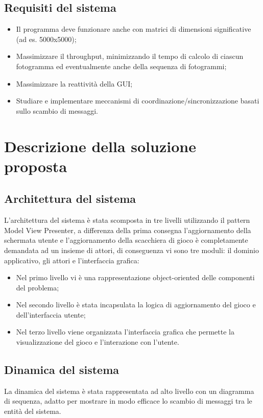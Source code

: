 \documentclass[a4paper]{report}
\begin{document}
\subsection{Requisiti del sistema}\label{requisiti-del-sistema-1}

\begin{itemize}
\item
  Il programma deve funzionare anche con matrici di dimensioni significative (ad es. 5000x5000);
\item
  Massimizzare il throughput, minimizzando il tempo di calcolo di ciascun fotogramma ed eventualmente anche della sequenza di fotogrammi;
\item
  Massimizzare la reattività della GUI;
\item
  Studiare e implementare meccanismi di coordinazione/sincronizzazione basati sullo scambio di messaggi.
\end{itemize}

\section{Descrizione della soluzione proposta}\label{descrizione-della-soluzione-proposta-1}

\subsection{Architettura del sistema}\label{architettura-del-sistema-1}

L'architettura del sistema è stata scomposta in tre livelli utilizzando il pattern Model View Presenter, a differenza della prima consegna l'aggiornamento della schermata utente e l'aggiornamento della scacchiera di gioco è completamente demandata ad un insieme di attori, di conseguenza vi sono tre moduli: il dominio applicativo, gli attori e l'interfaccia grafica:

\begin{itemize}
\item
  Nel primo livello vi è una rappresentazione object-oriented delle componenti del problema;
\item
  Nel secondo livello è stata incapsulata la logica di aggiornamento del gioco e dell'interfaccia utente;
\item
  Nel terzo livello viene organizzata l'interfaccia grafica che permette la visualizzazione del gioco e l'interazione con l'utente.
\end{itemize}

\subsection{Dinamica del sistema}\label{dinamica-del-sistema-1}
La dinamica del sistema è stata rappresentata ad alto livello con un diagramma di sequenza, adatto per mostrare in modo efficace lo scambio di messaggi tra le entità del sistema.
\end{document}
